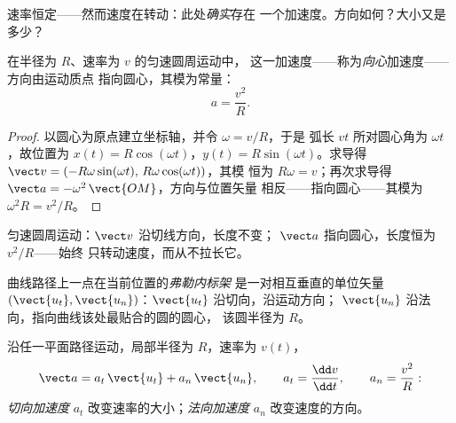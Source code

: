 速率恒定——然而速度在转动：此处\emph{确实}存在
一个加速度。方向如何？大小又是多少？

\begin{theorem}[向心加速度]\label{thm:g12:kinematics-2d:centripetal}
%
在半径为 $R$、速率为 $v$ 的匀速圆周运动中，
这一加速度——称为\emph{向心}加速度——方向由运动质点
指向圆心，其模为常量：
\[
a = \frac{v^2}{R}.
\]
\end{theorem}

\begin{proof}
以圆心为原点建立坐标轴，并令 $\omega = v/R$，于是
弧长 $v t$ 所对圆心角为 $\omega t$，故位置为
$x(t) = R\cos(\omega t)$，$y(t) = R\sin(\omega t)$。求导得
$\vect v = (-R\omega\sin(\omega t),\, R\omega\cos(\omega t))$，其模
恒为 $R\omega = v$；再次求导得
$\vect a = -\omega^2\,\vect{OM}$，方向与位置矢量
相反——指向圆心——其模为 $\omega^2 R = v^2/R$。
\end{proof}

\begin{omfigure}

{\small 匀速圆周运动：$\vect v$ 沿切线方向，长度不变；
$\vect a$ 指向圆心，长度恒为 $v^2/R$——始终
只转动速度，而从不拉长它。}
\end{omfigure}

\begin{definition}[弗勒内标架]\label{def:g12:kinematics-2d:frenet}
曲线路径上一点在当前位置的\emph{弗勒内标架}
是一对相互垂直的单位矢量
$(\vect{u_t}, \vect{u_n})$：$\vect{u_t}$ 沿切向，沿运动方向；
$\vect{u_n}$ 沿法向，指向曲线该处最贴合的圆的圆心，
该圆半径为 $R$。
\end{definition}

\begin{proposition}[弗勒内标架中的加速度]\label{prop:g12:kinematics-2d:frenetacc}
沿任一平面路径运动，局部半径为 $R$，速率为 $v(t)$，
\[
\vect a = a_t\,\vect{u_t} + a_n\,\vect{u_n},
\qquad a_t = \frac{\dd v}{\dd t},
\qquad a_n = \frac{v^2}{R}:
\]
\emph{切向加速度}
$a_t$ 改变速率的大小；\emph{法向加速度}
$a_n$ 改变速度的方向。
\end{proposition}
\admitted

